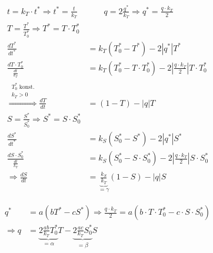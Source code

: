 \documentclass[11pt,a4paper]{article}
\begin{document}
	\newpage	
	
	\begin{align*}
		t = k_T \cdot t^* \Rightarrow t^* = \frac{t}{k_T} &\qquad
		q = 2\frac{q^*}{k_T} \Rightarrow q^* = \frac{q \cdot k_T}{2} \\
		T = \frac{T^*}{T^*_0} \Rightarrow T^* = T \cdot T^*_0 \\
		\frac{dT^*}{dt^*} &= k_T\left(T^*_{0} - T^*\right) - 2\left|q^*\right|T^* \\
		\frac{dT \cdot T^*_0}{\frac{dt}{k_T}} &= 
		k_T\left(T^*_{0} - T \cdot T^*_0 \right) - 2\left|\frac{q \cdot k_T}{2}\right|T \cdot T^*_0 \\
		\stackrel{\substack{
			T^*_{0} \textrm{ konst.}\\
			k_T > 0
		}}{\Rightarrow} \frac{dT}{dt} &=
		\left(1 - T\right) - \left|q\right|T \\
		S = \frac{S^*}{S^*_0} \Rightarrow S^* = S \cdot S^*_0 \\
		\frac{dS^*}{dt^*} &= k_S\left(S^*_{0} - S^*\right) - 2\left|q^*\right|S^* \\
		\frac{dS \cdot S^*_0}{\frac{dt}{k_T}} &= k_S\left(S^*_{0} - S \cdot S^*_0\right) - 2\left|\frac{q \cdot k_T}{2}\right|S \cdot S^*_0 \\
		\Rightarrow \frac{dS}{dt} &= \underbrace{\frac{k_S}{k_T}}_{=\gamma}\left(1 - S\right) - \left|q\right|S
	\end{align*}
	
	\begin{align*}
		q^* &= a \left( bT^* - cS^* \right)
		\Rightarrow \frac{q \cdot k_T}{2} = a\left(b \cdot T \cdot T^*_0 - c \cdot S \cdot S^*_0 \right) \\
		\Rightarrow q &= \underbrace{2\frac{ab}{k_T}T^*_0}_{=\alpha}T - \underbrace{2\frac{ac}{k_T}S^*_0}_{=\beta}S
	\end{align*}
	
\end{document}
